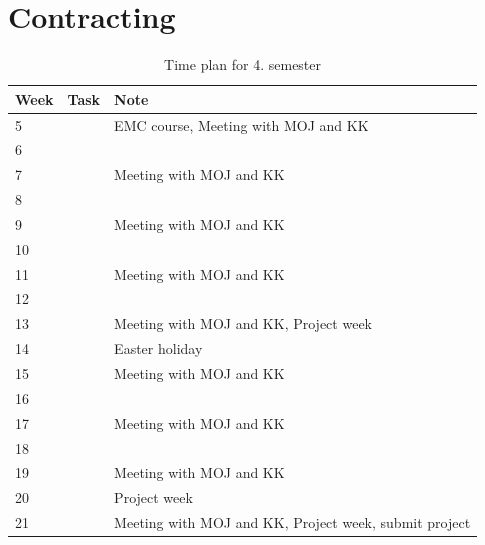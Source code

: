 \section{Contracting}
\begin{table}[H]
	\begin{tabular}{| p{1cm} |p{5cm}|p{10cm}|}
		\hline
		Week&	Task					&			Note 						\\\hline
		5 	& 							&	EMC course, Meeting with MOJ and KK	\\\hline
		6	& 							&				 						\\\hline
		7	& 							&	Meeting with MOJ and KK			 	\\\hline
		8	& 							&				 						\\\hline
		9	& 							&	Meeting with MOJ and KK			 	\\\hline
		10	& 							&				 						\\\hline
		11	& 							&	Meeting with MOJ and KK			 	\\\hline
		12	& 							&				 						\\\hline
		13	& 							&	Meeting with MOJ and KK, Project week\\\hline
		14	& 							&	Easter holiday					 	\\\hline
		15	& 							&	Meeting with MOJ and KK			 	\\\hline
		16	& 							&				 						\\\hline
		17	& 							&	Meeting with MOJ and KK			 	\\\hline
		18	& 							&				 						\\\hline
		19	& 							&	Meeting with MOJ and KK			 	\\\hline
		20	& 							&	Project week			 			\\\hline
		21	& 							&	Meeting with MOJ and KK, Project week, submit project \\\hline
	\end{tabular}
	\caption{Time plan for 4. semester}
\end{table}
